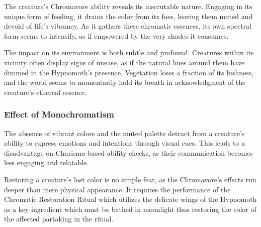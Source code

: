 The creature's Chromavore ability reveals its inscrutable nature. Engaging in its unique form of feeding, it drains the color from its foes, leaving them muted and devoid of life's vibrancy. As it gathers these chromatic essences, its own spectral form seems to intensify, as if empowered by the very shades it consumes.

The impact on its environment is both subtle and profound. Creatures within its vicinity often display signs of unease, as if the natural hues around them have dimmed in the Hypnomoth's presence. Vegetation loses a fraction of its lushness, and the world seems to momentarily hold its breath in acknowledgment of the creature's ethereal essence.
\\
\subsubsection*{Effect of Monochromatism}
The absence of vibrant colors and the muted palette detract from a creature's ability to express emotions and intentions through visual cues. This leads to a disadvantage on Charisma-based ability checks, as their communication becomes less engaging and relatable.

Restoring a creature's lost color is no simple feat, as the Chromavore's effects run deeper than mere physical appearance. It requires the performance of the Chromatic Restoration Ritual which utilizes the delicate wings of the Hypnomoth as a key ingredient which must be bathed in moonlight thus restoring the color of the affected partaking in the ritual.